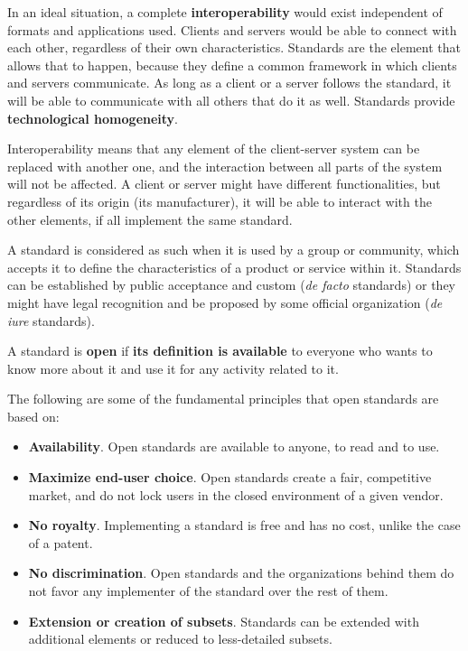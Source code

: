 In an ideal situation, a complete \textbf{interoperability} would exist independent of formats and applications used. Clients and servers would be able to connect with each other, regardless of their own characteristics. Standards are the element that allows that to happen, because they define a common framework in which clients and servers communicate. As long as a client or a server follows the standard, it will be able to communicate with all others that do it as well. Standards provide \textbf{technological homogeneity}.


Interoperability means that any element of the client-server system can be replaced with another one, and the interaction between all parts of the system will not  be affected. A client or server might have different functionalities, but regardless of its origin (its manufacturer), it will be able to interact with the other elements, if all implement the same standard.

A standard is considered as such when it is used by a group or community, which accepts it to define the characteristics of a product or service within it. Standards can be established by public acceptance and custom (\emph{de facto} standards) or they might have legal recognition and be proposed by some official organization (\emph{de iure} standards).

A standard is \textbf{open} if \textbf{its definition is available} to everyone who wants to know more about it and use it for any activity related to it.

The following are some of the fundamental principles that open standards are based on:

\begin{itemize}
	\item \textbf{Availability}. Open standards are available to anyone, to read and to use.
	\item \textbf{Maximize end-user choice}. Open standards create a fair, competitive market, and do not lock users in the closed environment of a given vendor. 
	\item \textbf{No royalty}. Implementing a standard is free and has no cost, unlike the case of a patent.
	\item \textbf{No discrimination}. Open standards and the organizations behind them do not favor any implementer of the standard over the rest of them.
	\item \textbf{Extension or creation of subsets}. Standards can be extended with additional elements or reduced to less-detailed subsets.
\end{itemize}

